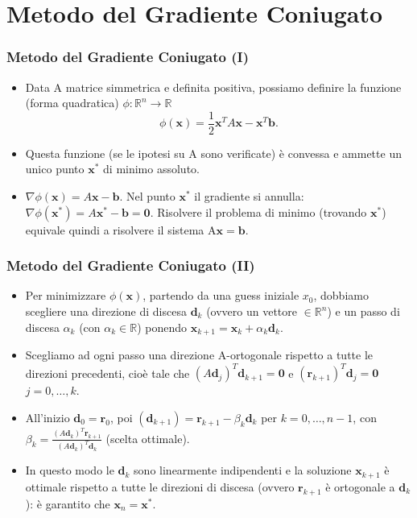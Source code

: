 \documentclass[10pt]{beamer}
\begin{document}
\section{Metodo del Gradiente Coniugato}\label{sec:sec2}

\begin{frame} \frametitle{Metodo del Gradiente Coniugato (I)}
\begin{itemize}
    \item Data A matrice simmetrica e definita positiva, possiamo definire la funzione (forma quadratica) $\phi:\mathbb{R}^n \to \mathbb{R}$ $$\phi(\mathbf{x})=\frac{1}{2}\mathbf{x}^TA\mathbf{x}-\mathbf{x}^T\mathbf{b}.$$
    
    \item Questa funzione (se le ipotesi su A sono verificate) è convessa e ammette un unico punto $\mathbf{x}^{\ast}$ di minimo assoluto.
    
    \item $\nabla \phi(\mathbf{x})=A\mathbf{x}-\mathbf{b}$. Nel punto $\mathbf{x}^{\ast}$ il gradiente si annulla: 
    $\nabla \phi(\mathbf{x}^{\ast})=A\mathbf{x}^{\ast}-\mathbf{b}=\mathbf{0}$.
    Risolvere il problema di minimo (trovando $\mathbf{x}^{\ast}$) equivale quindi a risolvere il sistema A$\mathbf{x}=\mathbf{b}$.

\end{itemize}
\end{frame}

\begin{frame} \frametitle{Metodo del Gradiente Coniugato (II)}
\begin{itemize}
    \item Per minimizzare $\phi(\mathbf{x})$, partendo da una \alert{guess} iniziale $x_0$, dobbiamo scegliere una \alert{direzione di discesa} $\mathbf{d}_{k}$ (ovvero un vettore $\in \mathbb{R}^n$) e un \alert{passo di discesa} $\alpha_k$ (con $\alpha_k \in \mathbb{R}$) ponendo $\mathbf{x}_{k+1}=\mathbf{x}_{k}+\alpha_k\mathbf{d}_{k}$.
    
    \item Scegliamo ad ogni passo una direzione A-ortogonale rispetto a tutte le direzioni precedenti, cioè tale che $(A\mathbf{d}_{j})^T\mathbf{d}_{k+1}=\mathbf{0}$ e $(\mathbf{r}_{k+1})^T\mathbf{d}_j=\mathbf{0}$ $j=0,\dots,k$.
    
    \item All'inizio $\mathbf{d}_0=\mathbf{r}_0$, poi $(\mathbf{d}_{k+1})=\mathbf{r}_{k+1}-\beta_k\mathbf{d}_k$ per $k=0,\dots,n-1$, con $\beta_k=\frac{(A\mathbf{d}_{k})^T\mathbf{r}_{k+1}}{(A\mathbf{d}_{k})^T\mathbf{d}_{k}}$ (scelta ottimale).
    
    \item In questo modo le $\mathbf{d}_k$ sono linearmente indipendenti e la soluzione $\mathbf{x}_{k+1}$ è ottimale rispetto a tutte le direzioni di discesa (ovvero $\mathbf{r}_{k+1}$ è ortogonale a $\mathbf{d}_k$): è garantito che $\mathbf{x}_n=\mathbf{x}^{\ast}$.
\end{itemize}
\end{frame}
\end{document}
